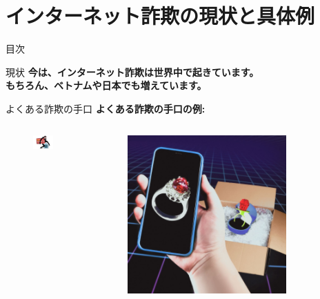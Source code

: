 \documentclass[xcolor=dvipsnames, aspectratio=1610]{beamer}
\begin{document}
\section{インターネット詐欺の現状と具体例}
\begin{frame}{目次}
\end{frame}
\begin{frame}{現状}
    \LARGE
    \textbf{今は、インターネット詐欺は世界中で起きています。} \\
    \pause
    \textbf{\alert{もちろん、ベトナムや日本でも増えています。}}
\end{frame}
\begin{frame}[t]{よくある詐欺の手口}
    \textbf{よくある詐欺の手口の例:}
    \begin{columns}
        \begin{column}{0.5\textwidth}
            \begin{figure}[h]
                \centering
                \includegraphics[width=0.8\textwidth]{images/2.jpg}
            \end{figure}
        \end{column}
        \begin{column}{0.5\textwidth}
            \begin{figure}[h]
                \centering
                \includegraphics[width=0.8\textwidth]{images/3.jpeg}

\end{figure}
\end{column}
\end{columns}
\end{frame}
\end{document}
